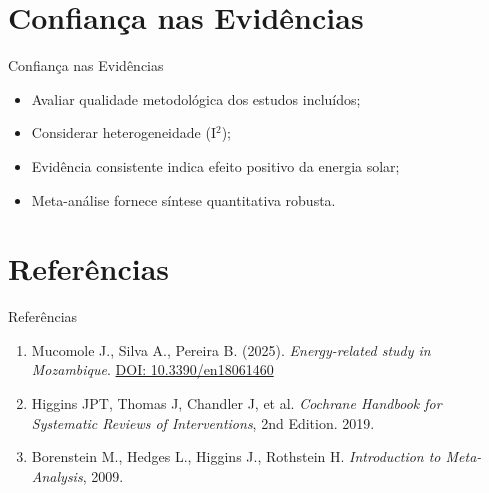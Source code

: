 \documentclass[12pt]{beamer}
\begin{document}
\section{Confiança nas Evidências}
\begin{frame}{Confiança nas Evidências}
\begin{itemize}
    \item Avaliar qualidade metodológica dos estudos incluídos;
    \item Considerar heterogeneidade (I\(^2\));
    \item Evidência consistente indica efeito positivo da energia solar;
    \item Meta-análise fornece síntese quantitativa robusta.
\end{itemize}
\end{frame}

\section{Referências}
\begin{frame}{Referências}
\begin{enumerate}
    \item Mucomole J., Silva A., Pereira B. (2025). \textit{Energy-related study in Mozambique}. \href{https://doi.org/10.3390/en18061460}{DOI: 10.3390/en18061460}
    \item Higgins JPT, Thomas J, Chandler J, et al. \textit{Cochrane Handbook for Systematic Reviews of Interventions}, 2nd Edition. 2019.
    \item Borenstein M., Hedges L., Higgins J., Rothstein H. \textit{Introduction to Meta-Analysis}, 2009.
\end{enumerate}
\end{frame}
\end{document}
